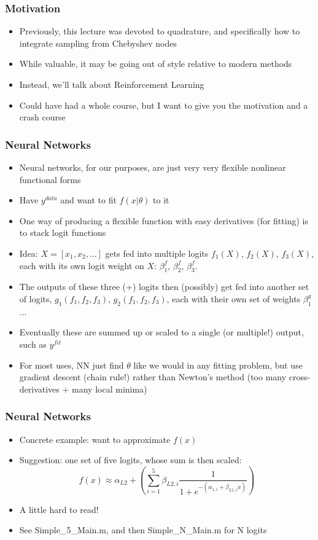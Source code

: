 \documentclass{beamer}
\author{Trevor S. Gallen}
\date{}
\begin{document}
\begin{frame}
\titlepage
\end{frame}

\begin{frame}
\frametitle[alignment=center]{Motivation}
\begin{itemize}
\item Previously, this lecture was devoted to quadrature, and specifically how to integrate sampling from Chebyshev nodes
\bigskip
\item While valuable, it may be going out of style relative to modern methods
\bigskip
\item Instead, we'll talk about Reinforcement Learning
\bigskip
\item Could have had a whole course, but I want to give you the motivation and a crash course
\end{itemize}
\end{frame}


\begin{frame}
\frametitle[alignment=center]{Neural Networks}
\begin{itemize}
\item Neural networks, for our purposes, are just very very flexible nonlinear functional forms
\smallskip
\item Have $y^{data}$ and want to fit $f(x|\theta)$ to it
\smallskip
\item One way of producing a flexible function with easy derivatives (for fitting) is to stack logit functions 
\smallskip
\item Idea:  $X=[x_1,x_2,...]$ gets fed into multiple logits $f_1(X)$, $f_2(X)$, $f_3(X)$, each with its own logit weight on $X$: $\beta_1^f$, $\beta_2^f$, $\beta_3^f$.
\smallskip
\item The outputs of these three (+) logits then (possibly) get fed into another set of logits, $g_1(f_1,f_2,f_3)$, $g_2(f_1,f_2,f_3)$, each with their own set of weights $\beta^g_1$...
\smallskip
\item Eventually these are summed up or scaled to a single (or multiple!) output, such as $y^{fit}$
\smallskip
\item For most uses, NN just find $\theta$ like we would in any fitting problem, but use gradient descent (chain rule!) rather than Newton's method (too many cross-derivatives + many local minima)
\end{itemize}
\end{frame}

\begin{frame}
\frametitle[alignment=center]{Neural Networks}
\begin{itemize}
\item Concrete example:  want to approximate $f(x)$
\bigskip
\item Suggestion:  one set of five logits, whose sum is then scaled:
$$f(x)\approx \alpha_{L2}+\left(\sum_{i=1}^5 \beta_{L2,i}\frac{1}{1+e^{-(\alpha_{1,i}+\beta_{L1,i}x)}}\right)$$
\item A little hard to read!  
\bigskip
\item See Simple\_5\_Main.m, and then Simple\_N\_Main.m for N logits
\end{itemize}
\end{frame}
\end{document}
